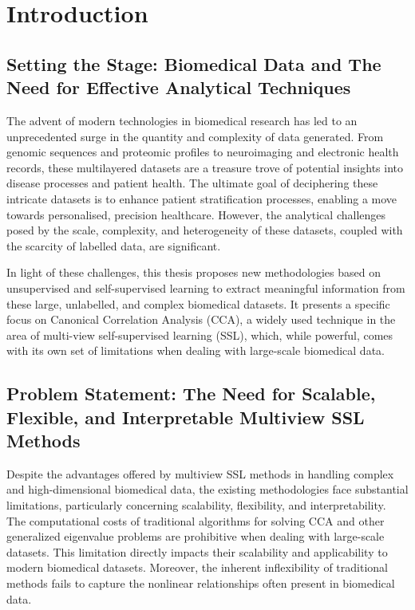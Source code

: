 \chapter{Introduction}\label{Introduction}
\minitoc
\section{Setting the Stage: Biomedical Data and The Need for Effective Analytical Techniques}

The advent of modern technologies in biomedical research has led to an unprecedented surge in the quantity and complexity of data generated. From genomic sequences and proteomic profiles to neuroimaging and electronic health records, these multilayered datasets are a treasure trove of potential insights into disease processes and patient health. The ultimate goal of deciphering these intricate datasets is to enhance patient stratification processes, enabling a move towards personalised, precision healthcare. However, the analytical challenges posed by the scale, complexity, and heterogeneity of these datasets, coupled with the scarcity of labelled data, are significant.

In light of these challenges, this thesis proposes new methodologies based on unsupervised and self-supervised learning to extract meaningful information from these large, unlabelled, and complex biomedical datasets. It presents a specific focus on Canonical Correlation Analysis (CCA), a widely used technique in the area of multi-view self-supervised learning (SSL), which, while powerful, comes with its own set of limitations when dealing with large-scale biomedical data.

\section{Problem Statement: The Need for Scalable, Flexible, and Interpretable Multiview SSL Methods}

Despite the advantages offered by multiview SSL methods in handling complex and high-dimensional biomedical data, the existing methodologies face substantial limitations, particularly concerning scalability, flexibility, and interpretability. The computational costs of traditional algorithms for solving CCA and other generalized eigenvalue problems are prohibitive when dealing with large-scale datasets. This limitation directly impacts their scalability and applicability to modern biomedical datasets. Moreover, the inherent inflexibility of traditional methods fails to capture the nonlinear relationships often present in biomedical data.


